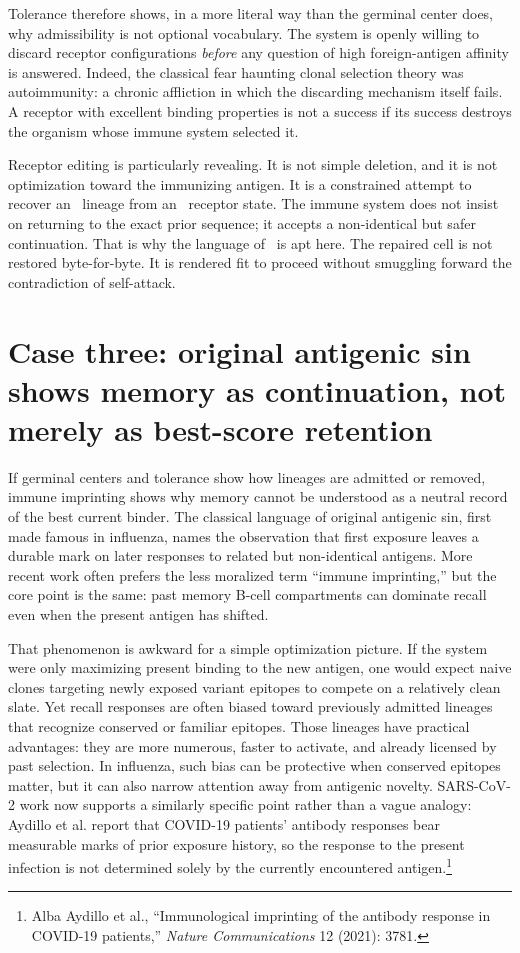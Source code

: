 \documentclass[11pt]{article}
\begin{document}
Tolerance therefore shows, in a more literal way than the germinal center does, why admissibility is not optional vocabulary. The system is openly willing to discard receptor configurations \emph{before} any question of high foreign-antigen affinity is answered. Indeed, the classical fear haunting clonal selection theory was autoimmunity: a chronic affliction in which the discarding mechanism itself fails. A receptor with excellent binding properties is not a success if its success destroys the organism whose immune system selected it.

Receptor editing is particularly revealing. It is not simple deletion, and it is not optimization toward the immunizing antigen. It is a constrained attempt to recover an \admissible\ lineage from an \inadmissible\ receptor state. The immune system does not insist on returning to the exact prior sequence; it accepts a non-identical but safer continuation. That is why the language of \repair\ is apt here. The repaired cell is not restored byte-for-byte. It is rendered fit to proceed without smuggling forward the contradiction of self-attack.

\section{Case three: original antigenic sin shows memory as continuation, not merely as best-score retention}
If germinal centers and tolerance show how lineages are admitted or removed, immune imprinting shows why memory cannot be understood as a neutral record of the best current binder. The classical language of original antigenic sin, first made famous in influenza, names the observation that first exposure leaves a durable mark on later responses to related but non-identical antigens. More recent work often prefers the less moralized term ``immune imprinting,'' but the core point is the same: past memory B-cell compartments can dominate recall even when the present antigen has shifted.

That phenomenon is awkward for a simple optimization picture. If the system were only maximizing present binding to the new antigen, one would expect naive clones targeting newly exposed variant epitopes to compete on a relatively clean slate. Yet recall responses are often biased toward previously admitted lineages that recognize conserved or familiar epitopes. Those lineages have practical advantages: they are more numerous, faster to activate, and already licensed by past selection. In influenza, such bias can be protective when conserved epitopes matter, but it can also narrow attention away from antigenic novelty. SARS-CoV-2 work now supports a similarly specific point rather than a vague analogy: Aydillo et al. report that COVID-19 patients' antibody responses bear measurable marks of prior exposure history, so the response to the present infection is not determined solely by the currently encountered antigen.\footnote{Alba Aydillo et al., ``Immunological imprinting of the antibody response in COVID-19 patients,'' \emph{Nature Communications} 12 (2021): 3781.}
\end{document}
